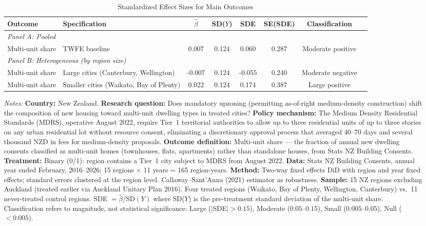 \begin{table}[H]
\centering
\caption{Standardized Effect Sizes for Main Outcomes}
\label{tab:sde}
\begin{threeparttable}
\footnotesize
\begin{adjustbox}{max width=\textwidth}
\begin{tabular}{lp{3.5cm}cccccc}
\toprule
Outcome & Specification & $\hat{\beta}$ & SD($Y$) & SDE & SE(SDE) & Classification \\
\midrule
\multicolumn{7}{l}{\textit{Panel A: Pooled}} \\
Multi-unit share & TWFE baseline & 0.007 & 0.124 & 0.060 & 0.287 & Moderate positive \\
\midrule
\multicolumn{7}{l}{\textit{Panel B: Heterogeneous (by region size)}} \\
Multi-unit share & Large cities (Canterbury, Wellington) & -0.007 & 0.124 & -0.055 & 0.240 & Moderate negative \\
Multi-unit share & Smaller cities (Waikato, Bay of Plenty) & 0.022 & 0.124 & 0.174 & 0.387 & Large positive \\
\bottomrule
\end{tabular}
\end{adjustbox}
\begin{tablenotes}[flushleft]
\small
\item \textit{Notes:} \textbf{Country:} New Zealand. \textbf{Research question:} Does mandatory upzoning (permitting as-of-right medium-density construction) shift the composition of new housing toward multi-unit dwelling types in treated cities? \textbf{Policy mechanism:} The Medium Density Residential Standards (MDRS), operative August 2022, require Tier~1 territorial authorities to allow up to three residential units of up to three stories on any urban residential lot without resource consent, eliminating a discretionary approval process that averaged 40--70 days and several thousand NZD in fees for medium-density proposals. \textbf{Outcome definition:} Multi-unit share --- the fraction of annual new dwelling consents classified as multi-unit homes (townhouses, flats, apartments) rather than standalone houses, from Stats NZ Building Consents. \textbf{Treatment:} Binary (0/1): region contains a Tier~1 city subject to MDRS from August 2022. \textbf{Data:} Stats NZ Building Consents, annual year ended February, 2016--2026; 15 regions $\times$ 11 years = 165 region-years. \textbf{Method:} Two-way fixed effects DiD with region and year fixed effects; standard errors clustered at the region level. Callaway--Sant'Anna (2021) estimator as robustness. \textbf{Sample:} 15 NZ regions excluding Auckland (treated earlier via Auckland Unitary Plan 2016). Four treated regions (Waikato, Bay of Plenty, Wellington, Canterbury) vs.\ 11 never-treated control regions. SDE $= \hat{\beta} / \text{SD}(Y)$ where SD($Y$) is the pre-treatment standard deviation of the multi-unit share. Classification refers to magnitude, not statistical significance: Large ($|$SDE$| > 0.15$), Moderate ($0.05$--$0.15$), Small ($0.005$--$0.05$), Null ($< 0.005$). 
\end{tablenotes}
\end{threeparttable}
\end{table}
